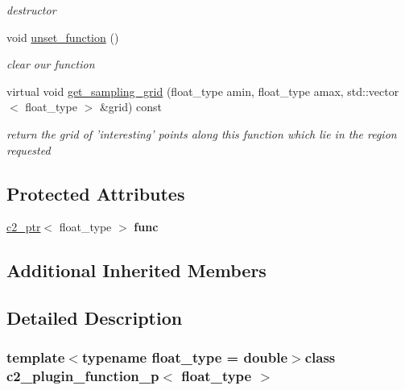 \begin{DoxyCompactItemize}
\begin{DoxyCompactList}\small\item\em destructor \end{DoxyCompactList}\item 
\hypertarget{classc2__plugin__function__p_aebe716e59908fe373f85e5aac964441f}{void \hyperlink{classc2__plugin__function__p_aebe716e59908fe373f85e5aac964441f}{unset\-\_\-function} ()}\label{classc2__plugin__function__p_aebe716e59908fe373f85e5aac964441f}

\begin{DoxyCompactList}\small\item\em clear our function \end{DoxyCompactList}\item 
virtual void \hyperlink{classc2__plugin__function__p_a0e7ff48329a648b3966efba72b15e3ed}{get\-\_\-sampling\-\_\-grid} (float\-\_\-type amin, float\-\_\-type amax, std\-::vector$<$ float\-\_\-type $>$ \&grid) const 
\begin{DoxyCompactList}\small\item\em return the grid of 'interesting' points along this function which lie in the region requested \end{DoxyCompactList}\end{DoxyCompactItemize}
\subsection*{Protected Attributes}
\begin{DoxyCompactItemize}
\item 
\hypertarget{classc2__plugin__function__p_a9f3ca0419f50aa9792da2a9b54716849}{\hyperlink{classc2__ptr}{c2\-\_\-ptr}$<$ float\-\_\-type $>$ {\bfseries func}}\label{classc2__plugin__function__p_a9f3ca0419f50aa9792da2a9b54716849}

\end{DoxyCompactItemize}
\subsection*{Additional Inherited Members}


\subsection{Detailed Description}
\subsubsection*{template$<$typename float\-\_\-type = double$>$class c2\-\_\-plugin\-\_\-function\-\_\-p$<$ float\-\_\-type $>$}


